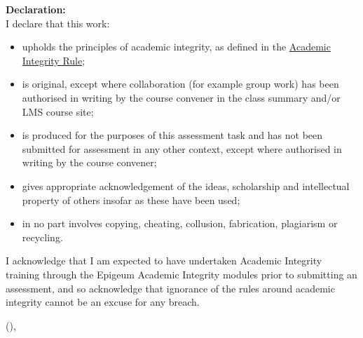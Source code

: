 {\sffamily\bfseries\Large Declaration:}\\

I declare that this work:
\begin{itemize}
  \item upholds the principles of academic integrity, as defined in the \href{https://www.legislation.gov.au/Details/F2021L00997}{Academic Integrity Rule};
  \item is original, except where collaboration (for example group work) has been authorised in writing by the course convener in the class summary and/or LMS course site;
  \item is produced for the purposes of this assessment task and has not been submitted for assessment in any other context, except where authorised in writing by the course convener;
  \item gives appropriate acknowledgement of the ideas, scholarship and intellectual property of others insofar as these have been used;
  \item in no part involves copying, cheating, collusion, fabrication, plagiarism or recycling.
\end{itemize}

I acknowledge that I am expected to have undertaken Academic Integrity training through the Epigeum Academic Integrity modules prior to submitting an assessment, and so acknowledge that ignorance of the rules around academic integrity cannot be an excuse for any breach.




\vspace{1 cm}
\hfill \monthname{} (\the\year), \AuthorName
\newpage




